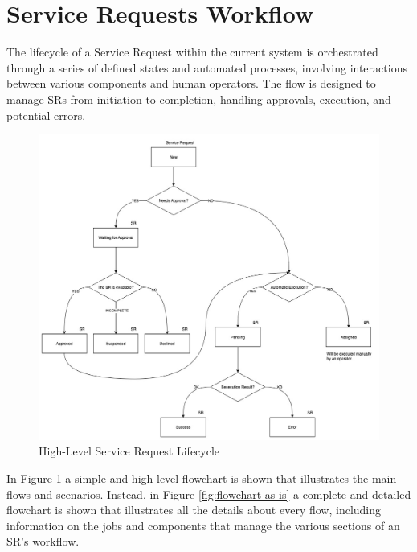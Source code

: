 \section{Service Requests Workflow}

The lifecycle of a Service Request within the current system is orchestrated through a series of defined states and automated processes, involving interactions between various components and human operators. The flow is designed to manage SRs from initiation to completion, handling approvals, execution, and potential errors.

\begin{figure}[htbp]
    \centering
    \includegraphics[width=\textwidth,keepaspectratio]{images/sr-state-diagram-simple.jpg}
    \caption{High-Level Service Request Lifecycle}
    \label{fig:sr-state-flowchart-simple}
\end{figure}


In Figure \ref{fig:sr-state-flowchart-simple} a simple and high-level flowchart is shown that illustrates the main flows and scenarios. Instead, in Figure \ref{fig:flowchart-as-is} a complete and detailed flowchart is shown that illustrates all the details about every flow, including information on the jobs and components that manage the various sections of an SR's workflow.


